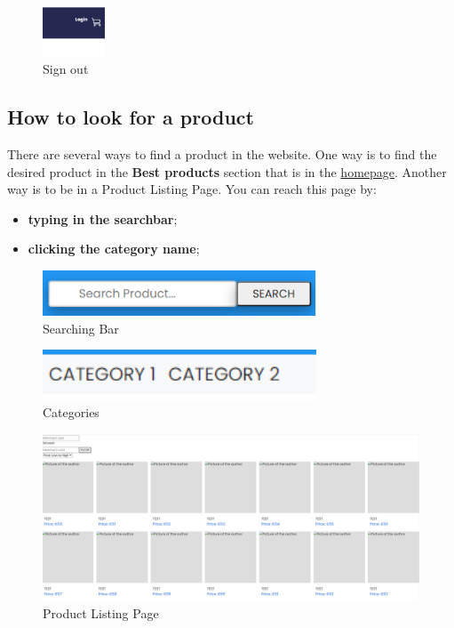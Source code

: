 \begin{figure}[H]
    \centering
    \includegraphics[width=5em]{res/images/cliente/signout.png}
    \caption{Sign out}
\end{figure}
\subsection{How to look for a product} \label{_lookforproduct}
There are several ways to find a product in the website. One way is to find the desired product in the \textbf{Best products} section that is in the \href{https://d28yg0rufs9lo7.cloudfront.net}{homepage}. Another way is to be in a Product Listing Page. You can reach this page by:
\begin{itemize} 
    \item \textbf{typing in the searchbar};
    \item \textbf{clicking the category name}; 
\end{itemize}

\begin{figure}[H]
    \centering
    \includegraphics[width=22em]{res/images/cliente/searchingbar.png}
    \caption{Searching Bar}
\end{figure}

\begin{figure}[H]
    \centering
    \includegraphics[width=22em]{res/images/cliente/categories.png}
    \caption{Categories}
\end{figure}

\begin{figure}[H]
    \centering
    \includegraphics[width=\linewidth]{res/images/cliente/plp.png}
    \caption{Product Listing Page}
\end{figure}

